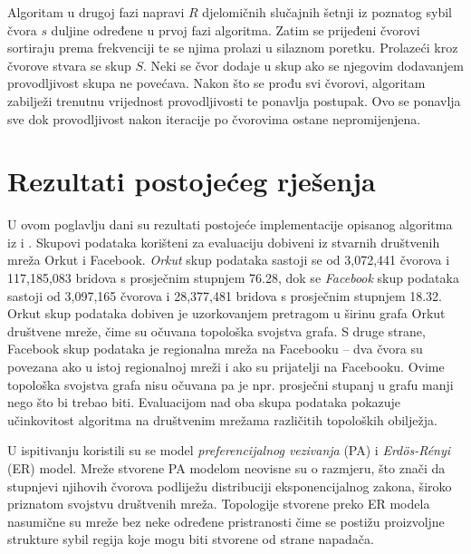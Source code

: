 \documentclass[times, utf8, seminar, numeric]{fer}
\begin{document}
Algoritam u drugoj fazi napravi $R$ djelomičnih slučajnih šetnji iz poznatog sybil čvora $s$ duljine određene u prvoj fazi algoritma. Zatim se prijeđeni čvorovi sortiraju prema frekvenciji te se njima prolazi u silaznom poretku. Prolazeći kroz čvorove stvara se skup $S$. Neki se čvor dodaje u skup ako se njegovim dodavanjem provodljivost skupa ne povećava. Nakon što se prođu svi čvorovi, algoritam zabilježi trenutnu vrijednost provodljivosti te ponavlja postupak. Ovo se ponavlja sve dok provodljivost nakon iteracije po čvorovima ostane nepromijenjena.

\chapter{Rezultati postojećeg rješenja}
U ovom poglavlju dani su rezultati postojeće implementacije opisanog algoritma iz \cite{sybil-defender-old} i \cite{sybil-defender}. Skupovi podataka korišteni za evaluaciju dobiveni iz stvarnih društvenih mreža Orkut i Facebook. \textit{Orkut} skup podataka sastoji se od 3,072,441 čvorova i 117,185,083 bridova s prosječnim stupnjem 76.28, dok se \textit{Facebook} skup podataka sastoji od 3,097,165 čvorova i 28,377,481 bridova s prosječnim stupnjem 18.32. Orkut skup podataka dobiven je uzorkovanjem pretragom u širinu grafa Orkut društvene mreže, čime su očuvana topološka svojstva grafa. S druge strane, Facebook skup podataka je regionalna mreža na Facebooku -- dva čvora su povezana ako u istoj regionalnoj mreži i ako su prijatelji na Facebooku. Ovime topološka svojstva grafa nisu očuvana pa je npr. prosječni stupanj u grafu manji nego što bi trebao biti. Evaluacijom nad oba skupa podataka pokazuje učinkovitost algoritma na društvenim mrežama različitih topoloških obilježja.

U ispitivanju koristili su se model \textit{preferencijalnog vezivanja}  (PA) i \textit{Erdös-Rényi} (ER) model. Mreže stvorene PA modelom neovisne su o razmjeru, što znači da stupnjevi njihovih čvorova podliježu distribuciji eksponencijalnog zakona, široko priznatom svojstvu društvenih mreža. Topologije stvorene preko ER modela nasumične su mreže bez neke određene pristranosti čime se postižu proizvoljne strukture sybil regija koje mogu biti stvorene od strane napadača.
\end{document}
